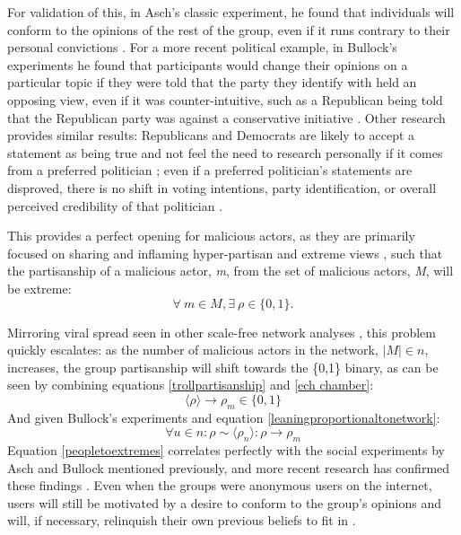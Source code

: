 \documentclass[12pt]{article}
\begin{document}
 For validation of this, in Asch's classic experiment, he found that individuals will conform to the opinions of the rest of the group, even if it runs contrary to their personal convictions \cite{asch1956studies}. For a more recent political example, in Bullock's experiments he found that participants would change their opinions on a particular topic if they were told that the party they identify with held an opposing view, even if it was counter-intuitive, such as a Republican being told that the Republican party was against a conservative initiative \cite{bullock2007experiments}. Other research provides similar results: Republicans and Democrats are likely to accept a statement as being true and not feel the need to research personally if it comes from a preferred politician \cite{housholder2014facebook}; even if a preferred politician's statements are disproved, there is no shift in voting intentions, party identification, or overall perceived credibility of that politician \cite{swire2017processing}. 
 
This provides a perfect opening for malicious actors, as they are primarily focused on sharing and inflaming hyper-partisan and extreme views \cite{bastos2019brexit,hegelich2016social,mueller2019mueller}, such that the partisanship of a malicious actor, \textit{m}, from the set of malicious actors, \textit{M}, will be extreme: 
\begin{equation}
\label{trollpartisanship}
\forall \ m \in M, \exists \ \rho \in \{0,1\}.
\end{equation}

Mirroring viral spread seen in other scale-free network analyses \cite{pastor2001epidemic,cohen2003efficient}, this problem quickly escalates: as the number of malicious actors in the network, $|M| \in n$, increases, the group partisanship will shift towards the \{0,1\} binary, as can be seen by combining equations \ref{trollpartisanship} and \ref{ech chamber}: 
\begin{equation}
\langle \rho \rangle \rightarrow \rho_m \in \{0,1\}
\end{equation} 
And given Bullock's experiments and equation \ref{leaningproportionaltonetwork}:
\begin{equation}
\label{peopletoextremes}
    \forall u \in n: \rho \sim \langle \rho_n \rangle: \rho \rightarrow \rho_m
\end{equation}
Equation \ref{peopletoextremes} correlates perfectly with the social experiments by Asch and Bullock mentioned previously, and more recent research has confirmed these findings \cite{colliander2019fake,edelson2011following}. Even when the groups were anonymous users on the internet, users will still be motivated by a desire to conform to the group's opinions and will, if necessary, relinquish their own previous beliefs to fit in \cite{williams2000cyberostracism,zhu2012switch,tsikerdekis2013effects,breitsohl2015groupthink,winter2015they,hamilton2017s}. 
\end{document}

